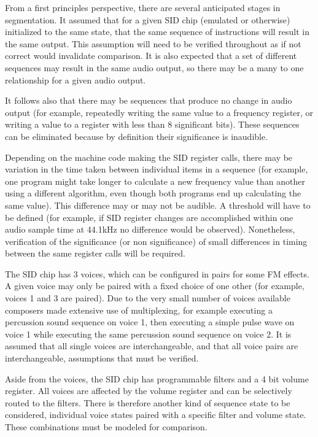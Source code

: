 \documentclass[10pt]{article}
\begin{document}
\begin{multicols*}{2}
  From a first principles perspective, there are several anticipated
  stages in segmentation. It assumed that for a given SID chip
  (emulated or otherwise) initialized to the same state, that the same
  sequence of instructions will result in the same output. This
  assumption will need to be verified throughout as if not correct
  would invalidate comparison. It is also expected that a set of
  different sequences may result in the same audio output, so there
  may be a many to one relationship for a given audio output.

  It follows also that there may be sequences that produce no change
  in audio output (for example, repeatedly writing the same value to a
  frequency register, or writing a value to a register with less than
  8 significant bits). These sequences can be eliminated because by
  definition their significance is inaudible.

  Depending on the machine code making the SID register calls, there
  may be variation in the time taken between individual items in a
  sequence (for example, one program might take longer to calculate a
  new frequency value than another using a different algorithm, even
  though both programs end up calculating the same value). This
  difference may or may not be audible. A threshold will have to be
  defined (for example, if SID register changes are accomplished
  within one audio sample time at 44.1kHz no difference would be
  observed).  Nonetheless, verification of the significance (or non
  significance) of small differences in timing between the same
  register calls will be required.

  The SID chip has 3 voices, which can be configured in pairs for some
  FM effects. A given voice may only be paired with a fixed choice of
  one other (for example, voices 1 and 3 are paired). Due to the very
  small number of voices available composers made extensive use of
  multiplexing, for example executing a percussion sound sequence on
  voice 1, then executing a simple pulse wave on voice 1 while
  executing the same percussion sound sequence on voice 2. It is
  assumed that all single voices are interchangeable, and that all
  voice pairs are interchangeable, assumptions that must be verified.

  Aside from the voices, the SID chip has programmable filters and a 4
  bit volume register. All voices are affected by the volume register
  and can be selectively routed to the filters. There is therefore
  another kind of sequence state to be considered, individual voice
  states paired with a specific filter and volume state. These
  combinations must be modeled for comparison.


\end{multicols*}
\end{document}

